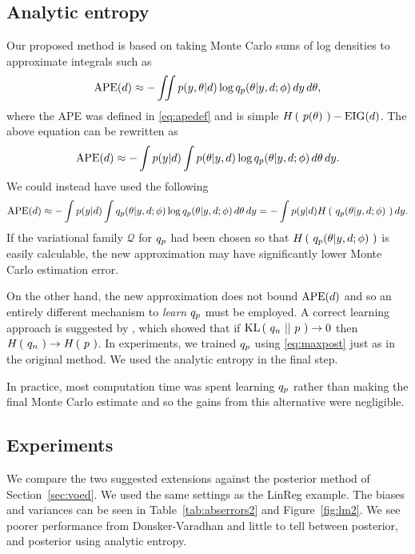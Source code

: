 \subsection{Analytic entropy}
Our proposed method is based on taking Monte Carlo sums of log densities to approximate integrals such as
\begin{equation}
	\label{eq:crossentropyest}
	\text{APE}(d) \approx -\iint p(y, \theta | d) \log q_p (\theta | y, d; \phi)\, dy\, d\theta,
\end{equation}
where the APE was defined in \eqref{eq:apedef} and is simple $H\left(\ p(\theta)\ \right) - \text{EIG}(d)$. The above equation can be rewritten as
\begin{equation}
	\text{APE}(d) \approx -\int p(y|d) \int p(\theta | y, d) \log q_p (\theta | y, d; \phi)\, d\theta\, dy.
\end{equation}
We could instead have used the following
\begin{equation}
	\text{APE}(d) \approx -\int p(y|d) \int q_p (\theta | y, d; \phi) \log q_p (\theta | y, d; \phi)\, d\theta\, dy = -\int p(y|d) H\left(\ q_p (\theta | y, d; \phi)\ \right) dy.
\end{equation}
If the variational family $\mathcal{Q}$ for $q_p$ had been chosen so that $H\left(\ q_p (\theta | y, d; \phi)\ \right)$ is easily calculable, the new approximation may have significantly lower Monte Carlo estimation error.

On the other hand, the new approximation does not bound $\text{APE}(d)$ and so an entirely different mechanism to \textit{learn} $q_p$ must be employed. A correct learning approach is suggested by \cite{piera2009}, which showed that if $\text{KL}\left(\ q_n\ ||\ p\ \right) \to 0$ then $H\left(\ q_n\ \right) \to H\left(\ p\ \right)$. In experiments, we trained $q_p$ using \eqref{eq:maxpost} just as in the original method. We used the analytic entropy in the final step.

In practice, most computation time was spent learning $q_p$ rather than making the final Monte Carlo estimate and so the gains from this alternative were negligible. 


\subsection{Experiments}
We compare the two suggested extensions against the posterior method of Section~\ref{sec:voed}. We used the same settings as the LinReg example. The biases and variances can be seen in Table~\ref{tab:abserrors2} and Figure~\ref{fig:lm2}. We see poorer performance from Donsker-Varadhan and little to tell between posterior, and posterior using analytic entropy.

